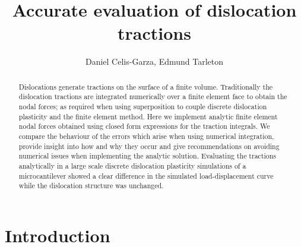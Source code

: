 \documentclass[11pt]{iopart}
\begin{document}
\title{Accurate evaluation of dislocation tractions}
\author[]{Daniel Celis-Garza, Edmund Tarleton}


\address{Department of Materials, University of Oxford, Parks Road, OX1 3PH, UK}

\begin{abstract}
    Dislocations generate tractions on the surface of a finite volume. Traditionally the dislocation tractions are integrated numerically over a finite element face to obtain the nodal forces; as required when using superposition to couple discrete dislocation plasticity and the finite element method. Here we implement analytic finite element nodal forces obtained using closed form expressions for the traction integrals. We compare the behaviour of the errors which arise when using numerical integration, provide insight into how and why they occur and give recommendations on avoiding numerical issues when implementing the analytic solution. Evaluating the tractions analytically in a large scale discrete dislocation plasticity simulations of a microcantilever showed a clear difference in the simulated load-displacement curve while the dislocation structure was unchanged.
\end{abstract}


\section{Introduction}\label{s:intro}
\end{document}
